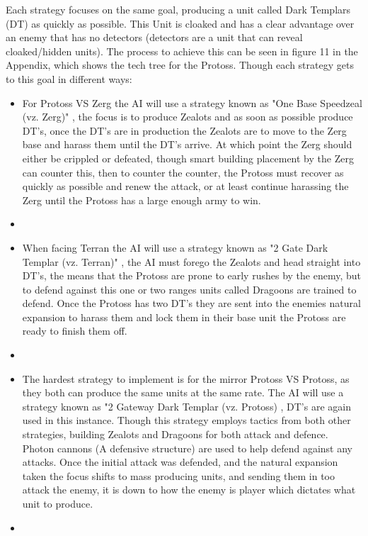 \documentclass[journal]{IEEEtran}
\begin{document}
Each strategy focuses on the same goal, producing a unit called Dark Templars (DT) as quickly as possible. This Unit is cloaked and has a clear advantage over an enemy that has no detectors (detectors are a unit that can reveal cloaked/hidden units). The process to achieve this can be seen in figure 11 in the Appendix, which shows the tech tree for the Protoss.
Though each strategy gets to this goal in different ways:

\begin{itemize}
	\item For Protoss VS Zerg the AI will use a strategy known as "One Base Speedzeal (vz. Zerg)" \cite{PVZ}, the focus is to produce Zealots and as soon as possible produce DT's, once the DT's are in production the Zealots are to move to the Zerg base and harass them until the DT's arrive. At which point the Zerg should either be crippled or defeated, though smart building placement by the Zerg can counter this, then to counter the counter, the Protoss must recover as quickly as possible and renew the attack, or at least continue harassing the Zerg until the Protoss has a large enough army to win.
	\item[]
	\item When facing Terran the AI will use a strategy known as "2 Gate Dark Templar (vz. Terran)" \cite{PVT}, the AI must forego the Zealots and head straight into DT's, the means that the Protoss are prone to early rushes by the enemy, but to defend against this one or two ranges units called Dragoons are trained to defend. Once the Protoss has two DT's they are sent into the enemies natural expansion to harass them and lock them in their base unit the Protoss are ready to finish them off.
	\item[]
	\item The hardest strategy to implement is for the mirror Protoss VS Protoss, as they both can produce the same units at the same rate. The AI will use a strategy known as "2 Gateway Dark Templar (vz. Protoss) \cite{PVP}, DT's are again used in this instance. Though this strategy employs tactics from both other strategies, building Zealots and Dragoons for both attack and defence. Photon cannons (A defensive structure) are used to help defend against any attacks. Once the initial attack was defended, and the natural expansion taken the focus shifts to mass producing units, and sending them in too attack the enemy, it is down to how the enemy is player which dictates what unit to produce.
	\item[]
\end{itemize}
\end{document}

